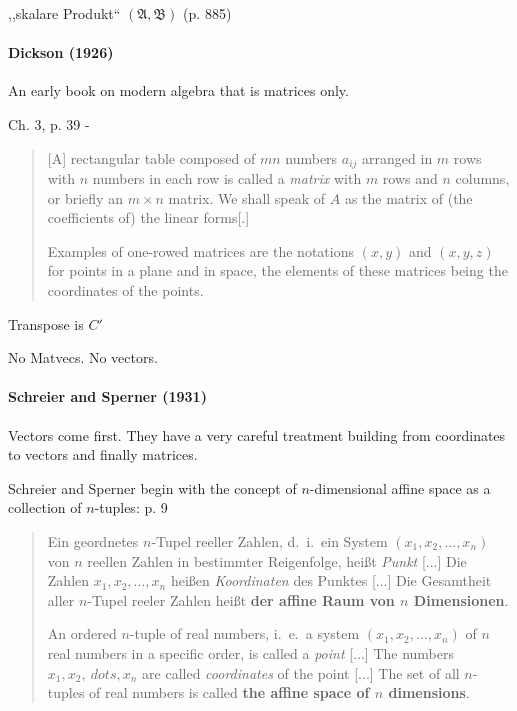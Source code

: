 ,,skalare Produkt`` $(\mathfrak A, \mathfrak B)$ (p. 885)



\paragraph{Dickson (1926)~\cite{Dickson1926}}

An early book on modern algebra that is matrices only.


Ch. 3, p. 39 -
\begin{quote}
[A] rectangular table composed of $mn$ numbers $a_{ij}$ arranged in
$m$ rows with $n$ numbers in each row is called a \textit{matrix} with $m$ rows
and $n$ columns, or briefly an $m\times n$ matrix. We shall speak of $A$ as the
matrix of (the coefficients of) the linear forms[.]

Examples of one-rowed matrices are the notations $(x, y)$ and
$(x, y, z)$ for points in a plane and in space, the elements of these
matrices being the coordinates of the points.
\end{quote}

Transpose is $C'$

No Matvecs. No vectors.


\paragraph{Schreier and Sperner (1931)~\cite{Schreier1931}}

Vectors come first. They have a very careful treatment building from coordinates
to vectors and finally matrices.

Schreier and Sperner begin with the concept of $n$-dimensional affine space
as a collection of $n$-tuples: p. 9

\begin{quote}
    Ein geordnetes $n$-Tupel reeller Zahlen, d.\ i.\ ein System $(x_1, x_2, \dots, x_n)$
    von $n$ reellen Zahlen in bestimmter Reigenfolge, heißt \textit{Punkt} [...]
    Die Zahlen $x_1, x_2, \dots, x_n$ heißen \textit{Koordinaten} des Punktes [...]
    Die Gesamtheit aller $n$-Tupel reeler Zahlen heißt \textbf{der affine
    Raum von $n$ Dimensionen}.

    An ordered $n$-tuple of real numbers, i.\ e.\ a system $(x_1, x_2, \dots, x_n)$ of
    $n$ real numbers in a specific order, is called a \textit{point} [...]
    The numbers $ x_1, x_2, \ dots, x_n$ are called \textit{coordinates} of the point [...]
    The set of all $n$-tuples of real numbers is called \textbf{the affine
    space of $n$ dimensions}.
\end{quote}

